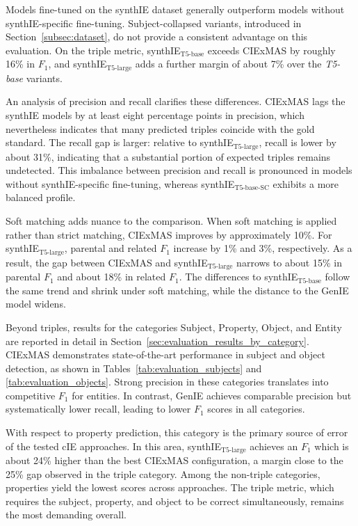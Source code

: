 \documentclass[a4paper,oneside,bibliography=totoc]{scrbook}
\begin{document}
Models fine-tuned on the synthIE dataset generally outperform models without synthIE-specific fine-tuning. Subject-collapsed variants, introduced in Section~\ref{subsec:dataset}, do not provide a consistent advantage on this evaluation. On the triple metric, synthIE$_{\text{T5-base}}$ exceeds CIExMAS by roughly 16\% in $F_1$, and synthIE$_{\text{T5-large}}$ adds a further margin of about 7\% over the \textit{T5-base} variants.

An analysis of precision and recall clarifies these differences. CIExMAS lags the synthIE models by at least eight percentage points in precision, which nevertheless indicates that many predicted triples coincide with the gold standard. The recall gap is larger: relative to synthIE$_{\text{T5-large}}$, recall is lower by about 31\%, indicating that a substantial portion of expected triples remains undetected. This imbalance between precision and recall is pronounced in models without synthIE-specific fine-tuning, whereas synthIE$_{\text{T5-base-SC}}$ exhibits a more balanced profile.

Soft matching adds nuance to the comparison. When soft matching is applied rather than strict matching, CIExMAS improves by approximately 10\%. For synthIE$_{\text{T5-large}}$, parental and related $F_1$ increase by 1\% and 3\%, respectively. As a result, the gap between CIExMAS and synthIE$_{\text{T5-large}}$ narrows to about 15\% in parental $F_1$ and about 18\% in related $F_1$. The differences to synthIE$_{\text{T5-base}}$ follow the same trend and shrink under soft matching, while the distance to the GenIE model widens.

Beyond triples, results for the categories Subject, Property, Object, and Entity are reported in detail in Section~\ref{sec:evaluation_results_by_category}. CIExMAS demonstrates state-of-the-art performance in subject and object detection, as shown in Tables~\ref{tab:evaluation_subjects} and \ref{tab:evaluation_objects}. Strong precision in these categories translates into competitive $F_1$ for entities. In contrast, GenIE achieves comparable precision but systematically lower recall, leading to lower $F_1$ scores in all categories.

With respect to property prediction, this category is the primary source of error of the tested \ac{cIE} approaches. In this area, synthIE$_{\text{T5-large}}$ achieves an $F_1$ which is about 24\% higher than the best CIExMAS configuration, a margin close to the 25\% gap observed in the triple category. Among the non-triple categories, properties yield the lowest scores across approaches. The triple metric, which requires the subject, property, and object to be correct simultaneously, remains the most demanding overall.
\end{document}
